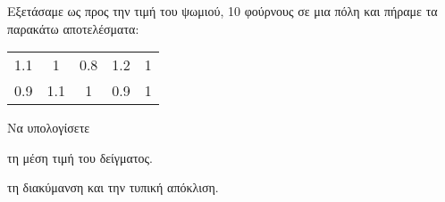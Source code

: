 Εξετάσαμε ως προς την τιμή του ψωμιού, 10 φούρνους σε μια πόλη και πήραμε τα παρακάτω αποτελέσματα:
\begin{center}
\begin{tabular}{ccccc}
1.1 & 1 & 0.8 & 1.2 & 1\\
0.9 & 1.1 & 1 & 0.9 & 1
\end{tabular}
\end{center}
Να υπολογίσετε
\begin{alist}
\item τη μέση τιμή του δείγματος.
\item τη διακύμανση και την τυπική απόκλιση.
\end{alist}
